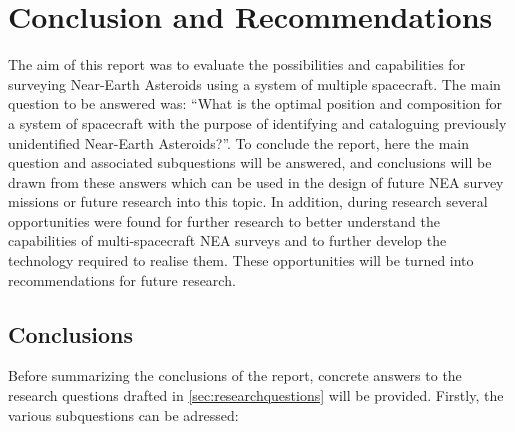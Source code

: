 \chapter{Conclusion and Recommendations}
\label{ch:conclusion}
The aim of this report was to evaluate the possibilities and capabilities for surveying Near-Earth Asteroids using a system of multiple spacecraft. The main question to be answered was: ``What is the optimal position and composition for a system of spacecraft with the purpose of identifying and cataloguing previously unidentified Near-Earth Asteroids?''. To conclude the report, here the main question and associated subquestions will be answered, and conclusions will be drawn from these answers which can be used in the design of future NEA survey missions or future research into this topic. In addition, during research several opportunities were found for further research to better understand the capabilities of multi-spacecraft NEA surveys and to further develop the technology required to realise them. These opportunities will be turned into recommendations for future research.

\section{Conclusions}
Before summarizing the conclusions of the report, concrete answers to the research questions drafted in \autoref{sec:researchquestions} will be provided. Firstly, the various subquestions can be adressed:

